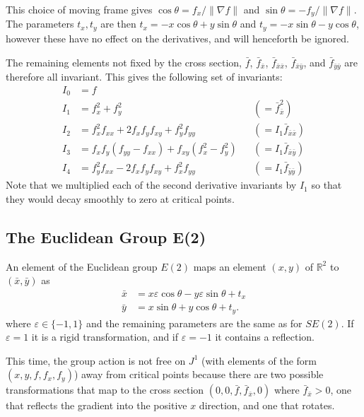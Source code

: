 \documentclass[review,onefignum,onetabnum]{siamonline190516}
\begin{document}
{This choice of moving frame gives $\cos\theta = f_x/\lVert\nabla f\rVert$
and $\sin\theta = -f_y/\lVert \nabla f \rVert$. The parameters $t_x, t_y$
are then $t_x = -x\cos\theta + y\sin\theta$ and $t_y = -x\sin\theta -
y\cos\theta$, however these have no effect on the derivatives, and will
henceforth be ignored.

The remaining elements not fixed by the cross section, $\bar{f}$,
$\bar{f}_{\bar{x}}$, $\bar{f}_{\bar{x}\bar{x}}$,
$\bar{f}_{\bar{x}\bar{y}}$, and $\bar{f}_{\bar{y}\bar{y}}$ are therefore
all invariant. This gives the following set of invariants:
\begin{equation}\label{eq:se2invariants}
\begin{aligned}
  I_0 &= f \\
  I_1 &= f_x^2 + f_y^2 & &(= \bar{f}_{\bar{x}}^2)\\
  I_2 &= f_x^2 f_{xx} + 2 f_x f_y f_{xy} + f_y^2 f_{yy} &&(= I_1\bar{f}_{\bar{x}\bar{x}}) \\
  I_3 &= f_x f_y (f_{yy} - f_{xx}) + f_{xy} (f_x^2 - f_y^2) &&(= I_1\bar{f}_{\bar{x}\bar{y}})\\
  I_4 &= f_y^2 f_{xx} - 2 f_x f_y f_{xy} + f_x^2 f_{yy} &&(= I_1\bar{f}_{\bar{y}\bar{y}})
\end{aligned}
\end{equation}
Note that we multiplied each of the second derivative invariants by $I_1$
so that they would decay smoothly to zero at critical points.


\subsection{The Euclidean Group E(2)}
An element of the Euclidean group $E(2)$ maps an element $(x, y)$ of
$\mathbb{R}^2$ to $(\bar{x}, \bar{y})$ as 
\begin{equation*}
  \begin{aligned}
    \bar{x} &=  x\varepsilon\cos\theta  - y\varepsilon\sin\theta + t_x \\
    \bar{y} &= x\sin\theta  + y\cos\theta + t_y.
  \end{aligned}
\end{equation*}
where $\varepsilon \in \{-1, 1\}$ and the remaining parameters are the same
as for $SE(2)$. If $\varepsilon = 1$ it is a rigid transformation, and if
$\varepsilon = -1$ it contains a reflection.

This time, the group action is not free on $J^1$ (with elements of the form
$(x, y, f, f_x, f_y)$) away from critical points because there are two
possible transformations that map to the cross section $(0, 0, \bar{f},
\bar{f}_{\bar{x}}, 0)$ where $\bar{f}_{\bar{x}} > 0$, one that reflects the
gradient into the positive $x$ direction, and one that rotates. 

}
\end{document}
